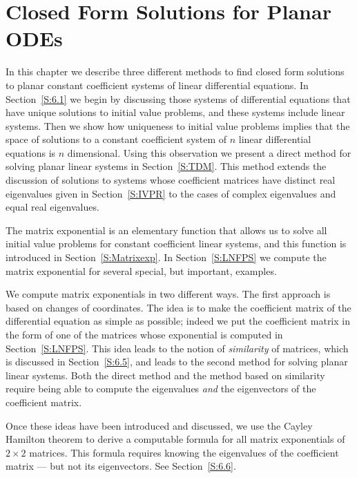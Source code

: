 \chapter{Closed Form Solutions for Planar ODEs}
\label{Chap:Planar}

\normalsize

In this chapter we describe three different methods to find closed form
solutions to planar constant coefficient systems of linear differential
equations.  In Section~\ref{S:6.1} we begin by discussing those systems of
differential equations that have unique solutions to initial value problems,
and these systems include linear systems.  Then we show how uniqueness to
initial value problems implies that the space of solutions to a constant
coefficient system of $n$ linear differential equations is $n$ dimensional.
Using this observation we present a direct method for solving planar linear
systems in Section~\ref{S:TDM}.  This method extends the discussion of
solutions to systems whose coefficient matrices have distinct real
eigenvalues given in Section~\ref{S:IVPR} to the cases of complex
eigenvalues and equal real eigenvalues.

The matrix exponential is an elementary function that allows us to solve
all initial value problems for constant coefficient linear systems, and
this function is introduced in Section~\ref{S:Matrixexp}.  In
Section~\ref{S:LNFPS} we compute the matrix exponential for several
special, but important, examples.

We compute matrix exponentials in two different ways.  The first approach is
based on changes of coordinates.  The idea is to make the coefficient matrix
of the differential equation as simple as possible; indeed we put the
coefficient matrix in the form of one of the matrices whose exponential is
computed in Section~\ref{S:LNFPS}.  This idea leads to the notion of
{\em similarity\/} of matrices, which is discussed in Section~\ref{S:6.5}, and
leads to the second method for solving planar linear systems. Both the direct
method and the method based on similarity require being able to compute the
eigenvalues {\em and\/} the eigenvectors of the coefficient matrix.

Once these ideas have been introduced and discussed, we use the
Cayley Hamilton theorem to derive a computable formula for all matrix
exponentials of $2\times 2$ matrices.  This formula requires knowing
the eigenvalues of the coefficient matrix --- but not its eigenvectors.
See Section~\ref{S:6.6}.

